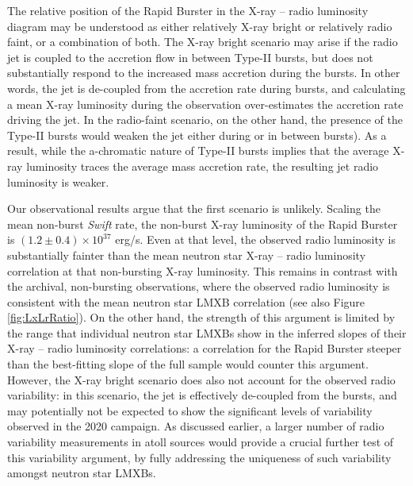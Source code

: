 \documentclass[fleqn,usenatbib]{mnras}
\begin{document}
The relative position of the Rapid Burster in the X-ray -- radio luminosity diagram may be understood as either relatively X-ray bright or relatively radio faint, or a combination of both. The X-ray bright scenario may arise if the radio jet is coupled to the accretion flow in between Type-II bursts, but does not substantially respond to the increased mass accretion during the bursts. In other words, the jet is de-coupled from the accretion rate during bursts, and calculating a mean X-ray luminosity during the observation over-estimates the accretion rate driving the jet. In the radio-faint scenario, on the other hand, the presence of the Type-II bursts would weaken the jet either during or in between bursts). As a result, while the a-chromatic nature of Type-II bursts implies that the average X-ray luminosity traces the average mass accretion rate, the resulting jet radio luminosity is weaker. 

Our observational results argue that the first scenario is unlikely. Scaling the mean non-burst \textit{Swift} rate, the non-burst X-ray luminosity of the Rapid Burster is $(1.2\pm0.4)\times10^{37}$ erg/s. Even at that level, the observed radio luminosity is substantially fainter than the mean neutron star X-ray -- radio luminosity correlation at that non-bursting X-ray luminosity. This remains in contrast with the archival, non-bursting observations, where the observed radio luminosity is consistent with the mean neutron star LMXB correlation (see also Figure \ref{fig:LxLrRatio}). On the other hand, the strength of this argument is limited by the range that individual neutron star LMXBs show in the inferred slopes of their X-ray -- radio luminosity correlations: a correlation for the Rapid Burster steeper than the best-fitting slope of the full sample would counter this argument. However, the X-ray bright scenario does also not account for the observed radio variability: in this scenario, the jet is effectively de-coupled from the bursts, and may potentially not be expected to show the significant levels of variability observed in the 2020 campaign. As discussed earlier, a larger number of radio variability measurements in atoll sources would provide a crucial further test of this variability argument, by fully addressing the uniqueness of such variability amongst neutron star LMXBs. 
\end{document}
